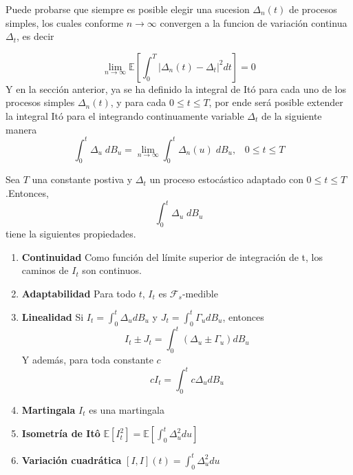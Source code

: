 \documentclass[11pt,notitlepage]{article}
\begin{document}
Puede probarse que siempre es posible elegir una sucesion \(\Delta_n(t)\) de procesos simples, los cuales conforme \(n \to \infty \) convergen a la funcion de variación continua  \(\Delta_{t}\), es decir

\[\lim_{n\rightarrow \infty }\mathbb{E}\left[\int_{0}^{T}\left | \Delta _n(t)-\Delta_{t} \right |^{2} dt\right] =0\]
Y en la sección anterior, ya se ha definido la integral de Itó para cada uno de los procesos simples \(\Delta_n(t)\), y para cada \(0 \leq t \leq T\), por ende será posible extender la integral Itó para el integrando continuamente variable  \(\Delta_{t}\) de la siguiente manera
\begin{equation}
    \int_{0}^{t}\Delta_{u}\;dB_u=\lim_{n \to \infty} \int_{0}^{t}\Delta_n(u)\;dB_u,\;\;\; 0\leq t\leq T
\end{equation}
\begin{teor}

Sea \(T\) una constante postiva y \(\Delta_{t}\) un proceso estocástico adaptado con \(0 \leq t\leq T\).Entonces, 
\[\int_{0}^{t}\Delta_{u}\;dB_u\] tiene la siguientes propiedades.
\begin{enumerate}
    \item \textbf{Continuidad} Como función del límite superior de integración de t, los caminos de \(I_{t}\) son continuos.
    \item \textbf{Adaptabilidad} Para todo \(t\), \(I_{t}\) es \(\mathcal{F}_s\)-medible
    \item \textbf{Linealidad} Si \(I_{t}= \int_{0}^{t}\Delta_{u}dB_u\) y \(J_{t}= \int_{0}^{t}\Gamma_{u}dB_u\), entonces
    \[I_{t} \pm  J_t= \int_{0}^{t}(\Delta_{u} \pm \Gamma_{u} )dB_u\] 
    Y además, para toda constante $c$
    \[cI_t= \int_{0}^{t}c\Delta_{u}dB_u\]
    \item \textbf{Martingala} \(I_{t}\) es una martingala
    \item \textbf{Isometría de Itô} \(\mathbb{E}[I^{2}_t]= \mathbb{E}\left[\int_{0}^{t}\Delta^{2}_{u}du\right]\)
    \item \textbf{Variación cuadrática} \([I,I](t)= \int_{0}^{t}\Delta^{2}_{u}du\)
\end{enumerate}
\end{teor}
\end{document}
